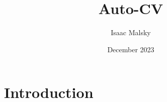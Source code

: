 \documentclass{article}
\title{Auto-CV}
\author{Isaac Malsky}
\date{December 2023}
\begin{document}
\maketitle

\section{Introduction}
\end{document}
